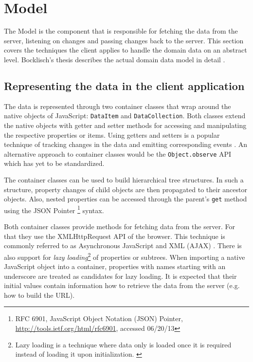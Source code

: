 \section{Model}

The Model is the component that is responsible for fetching the data from the server, listening on changes and passing changes back to the server. This section covers the techniques the client applies to handle the domain data on an abstract level. Bocklisch's thesis describes the actual domain data model in detail \cite{Bocklisch_2013}.

\subsection{Representing the data in the client application}

The data is represented through two container classes that wrap around the native objects of Ja\-va\-Script: \texttt{DataItem} and \texttt{DataCollection}. Both classes extend the native objects with getter and setter methods for accessing and manipulating the respective properties or items. Using getters and setters is a popular technique of tracking changes in the data and emitting corresponding events \cite{Osmani_2013}. An alternative approach to container classes would be the \texttt{Object.observe} API \cite{Waldron_2012} which has yet to be standardized.

The container classes can be used to build hierarchical tree structures. In such a structure, property changes of child objects are then propagated to their ancestor objects. Also, nested properties can be accessed through the parent's \texttt{get} method using the JSON Pointer \footnote{RFC 6901, JavaScript Object Notation (JSON) Pointer, \url{http://tools.ietf.org/html/rfc6901}, accessed 06/20/13} syntax.

Both container classes provide methods for fetching data from the server. For that they use the XMLHttpRequest \cite{W3C_XHR} API of the browser. This technique is commonly referred to as Asynchronous JavaScript and XML (AJAX) \cite{Garrett_2005}. There is also support for \textit{lazy loading}\footnote{Lazy loading is a technique where data only is loaded once it is required instead of loading it upon initialization. \cite{Fowler_2002}} of properties or subtrees. When importing a native JavaScript object into a container, properties with names starting with an underscore are treated as candidates for lazy loading. It is expected that their initial values contain information how to retrieve the data from the server (e.g. how to build the URL).


